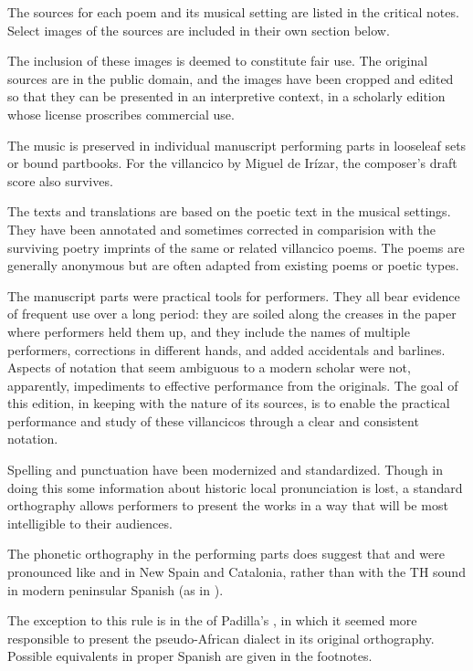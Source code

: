 
The sources for each poem and its musical setting are listed in the 
critical notes.
Select images of the sources are included in their own section below.%
\begin{Footnote}
    The inclusion of these images is deemed to constitute fair use. 
    The original sources are in the public domain, and the images have been
    cropped and edited so that they can be presented in an interpretive context, 
    in a scholarly edition whose license proscribes commercial use.
\end{Footnote}
The music is preserved in individual manuscript performing parts in looseleaf 
sets or bound partbooks.
For the villancico by Miguel de Irízar, the composer's draft score also 
survives.

The texts and translations are based on the poetic text in the musical settings.
They have been annotated and sometimes corrected in comparision with the 
surviving poetry imprints of the same or related villancico poems.
The poems are generally anonymous but are often adapted from existing poems or 
poetic types.

The manuscript parts were practical tools for performers.
They all bear evidence of frequent use over a long period: they are soiled 
along the creases in the paper where performers held them up, and they include 
the names of multiple performers, corrections in different hands, and added 
accidentals and barlines.
Aspects of notation that seem ambiguous to a modern scholar were not, 
apparently, impediments to effective performance from the originals.
The goal of this edition, in keeping with the nature of its sources, is to 
enable the practical performance and study of these villancicos through a clear
and consistent notation.


Spelling and punctuation have been modernized and standardized.
Though in doing this some information about historic local pronunciation is
lost, a standard orthography allows performers to present the works in a way
that will be most intelligible to their audiences.%
\begin{Footnote}
    The phonetic orthography in the performing parts does suggest that
     and  were pronounced like  and
     in New Spain and Catalonia, rather than with the TH sound in
    modern peninsular Spanish (as in ).
\end{Footnote}
The exception to this rule is in the  of Padilla's , in which it seemed more responsible to present the 
pseudo-African dialect in its original orthography.
Possible equivalents in proper Spanish are given in the footnotes.

